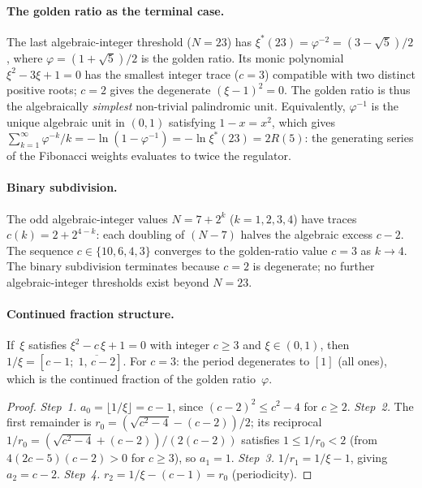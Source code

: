 \paragraph{The golden ratio as the terminal case.}
The last algebraic-integer threshold ($N = 23$) has
$\xi^*(23) = \varphi^{-2} = (3 - \sqrt{5})/2$, where
$\varphi = (1{+}\sqrt{5})/2$ is the golden ratio.  Its monic
polynomial $\xi^2 - 3\xi + 1 = 0$ has the smallest integer
trace ($c = 3$) compatible with two distinct positive roots;
$c = 2$ gives the degenerate $(\xi{-}1)^2 = 0$.  The golden
ratio is thus the algebraically \emph{simplest} non-trivial
palindromic unit.
Equivalently, $\varphi^{-1}$ is the unique algebraic unit
in $(0,1)$ satisfying $1 - x = x^2$, which gives
$\sum_{k=1}^{\infty}\varphi^{-k}/k
= -\ln(1{-}\varphi^{-1}) = -\ln\xi^*(23) = 2R(5)$:
the generating series of the Fibonacci weights evaluates to
twice the regulator.

\paragraph{Binary subdivision.}
The odd algebraic-integer values $N = 7 + 2^k$ ($k = 1, 2, 3, 4$)
have traces $c(k) = 2 + 2^{4-k}$: each doubling of $(N{-}7)$
halves the algebraic excess $c - 2$.  The sequence
$c \in \{10, 6, 4, 3\}$ converges to the golden-ratio value
$c = 3$ as $k \to 4$.  The binary subdivision terminates because
$c = 2$ is degenerate; no further algebraic-integer thresholds
exist beyond $N = 23$.

\paragraph{Continued fraction structure.}
\begin{proposition}\label{prop:cf-palindromic}
If\, $\xi$ satisfies $\xi^2 - c\,\xi + 1 = 0$ with integer
$c \ge 3$ and $\xi \in (0,1)$, then
$1/\xi = [c{-}1;\;\overline{1,\, c{-}2}]$.
For $c = 3$: the period degenerates to $[1]$ (all ones), which
is the continued fraction of the golden ratio~$\varphi$.
\end{proposition}

\begin{proof}
\emph{Step~1.}  $a_0 = \lfloor 1/\xi\rfloor = c - 1$, since
$(c{-}2)^2 \le c^2 - 4$ for $c \ge 2$.
\emph{Step~2.}  The first remainder is
$r_0 = (\sqrt{c^2{-}4} - (c{-}2))/2$; its reciprocal
$1/r_0 = (\sqrt{c^2{-}4} + (c{-}2))/(2(c{-}2))$ satisfies
$1 \le 1/r_0 < 2$ (from $4(2c{-}5)(c{-}2) > 0$ for $c \ge 3$),
so $a_1 = 1$.
\emph{Step~3.}  $1/r_1 = 1/\xi - 1$, giving $a_2 = c - 2$.
\emph{Step~4.}  $r_2 = 1/\xi - (c{-}1) = r_0$ (periodicity).
\end{proof}

